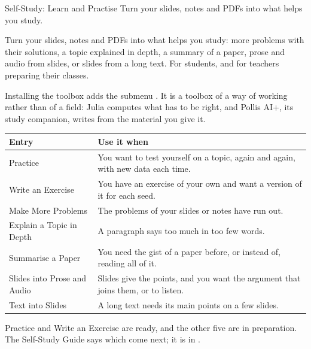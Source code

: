 
\renewcommand{\vignetteauthor}{Pollis}
\renewcommand{\vignettedate}{4 November 2026}
\renewcommand{\vignettelicense}{AGPL-3.0}



  {Self-Study: Learn and Practise}
  {Turn your slides, notes and PDFs into what helps you study.}

Turn your slides, notes and PDFs into what helps you study: more problems with their solutions, a topic
explained in depth, a summary of a paper, prose and audio from slides, or slides from a long text. For
students, and for teachers preparing their classes.

Installing the toolbox adds the submenu . It is a toolbox
of a way of working rather than of a field: Julia computes what has to be right, and Pollis AI+, its study companion,
writes from the material you give it.

\medskip
{\small
\begin{tabularx}{\linewidth}{@{}>{\raggedright\arraybackslash}p{50mm}X@{}}
\toprule
\textbf{Entry} & \textbf{Use it when} \\\midrule
Practice & You want to test yourself on a topic, again and again, with new data each time. \\
Write an Exercise & You have an exercise of your own and want a version of it for each seed. \\
Make More Problems & The problems of your slides or notes have run out. \\
Explain a Topic in Depth & A paragraph says too much in too few words. \\
Summarise a Paper & You need the gist of a paper before, or instead of, reading all of it. \\
Slides into Prose and Audio & Slides give the points, and you want the argument that joins them, or to listen. \\
Text into Slides & A long text needs its main points on a few slides. \\\bottomrule
\end{tabularx}}

\medskip
Practice and Write an Exercise are ready, and the other five are in preparation. The Self-Study Guide says
which come next; it is in .

